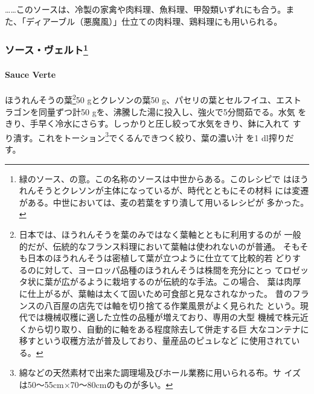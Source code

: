 \begin{recette}
\ldots{}\ldots{}このソースは、冷製の家禽や肉料理、魚料理、甲殻類いずれにも合う。ま
た、「ディアーブル（悪魔風）」仕立ての肉料理、鶏料理にも用いられる。

\maeaki

\hypertarget{ux30bdux30fcux30b9ux30f4ux30a7ux30ebux30c841}{%
\subsubsection[ソース・ヴェルト]{\texorpdfstring{ソース・ヴェルト\footnote{緑のソース、の意。この名称のソースは中世からある。このレシピで
  はほうれんそうとクレソンが主体になっているが、時代とともにその材料
  には変遷がある。中世においては、麦の若葉をすり潰して用いるレシピが
  多かった。}}{ソース・ヴェルト}}\label{ux30bdux30fcux30b9ux30f4ux30a7ux30ebux30c841}}

\hypertarget{sauce-verte}{%
\paragraph{Sauce Verte}\label{sauce-verte}}


ほうれんそうの葉\footnote{日本では、ほうれんそうを葉のみではなく葉軸とともに利用するのが
  一般的だが、伝統的なフランス料理において葉軸は使われないのが普通。
  そもそも日本のほうれんそうは密植して葉が立つように仕立てて比較的若
  どりするのに対して、ヨーロッパ品種のほうれんそうは株間を充分にとっ
  てロゼッタ状に葉が広がるように栽培するのが伝統的な手法。この場合、
  葉は肉厚に仕上がるが、葉軸は太くて固いため可食部と見なされなかった。
  昔のフランスの八百屋の店先では軸を切り捨てる作業風景がよく見られた
  という。現代では機械収穫に適した立性の品種が増えており、専用の大型
  機械で株元近くから切り取り、自動的に軸をある程度除去して併走する巨
  大なコンテナに移すという収穫方法が普及しており、量産品のピュレなど
  に使用されている。}50 gとクレソンの葉50
g、パセリの葉とセルフイユ、エスト ラゴンを同量ずつ計50
gを、沸騰した湯に投入し、強火で5分間茹でる。水気
をきり、手早く冷水にさらす。しっかりと圧し絞って水気をきり、鉢に入れて
すり潰す。これをトーション\footnote{綿などの天然素材で出来た調理場及びホール業務に用いられる布。サ
  イズは50〜55cm×70〜80cmのものが多い。}でくるんできつく絞り、葉の濃い汁
を1 dl搾りだす。


\end{recette}
